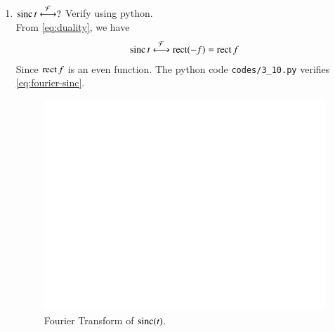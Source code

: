 \documentclass[journal,12pt,twocolumn]{IEEEtran}
\renewcommand\thesection{\arabic{section}}
\begin{document}
\begin{enumerate}[label=\thesection.\arabic*
,ref=\thesection.\theenumi]
\begin{figure}[!ht]
    \caption{Fourier Transform of $\rect(t)$.}
    \label{eq:fig-fourier-rect}
\end{figure}
\item $\mathop{\mathrm{sinc}}{t}\overset{\mathcal{F}}{ \longleftrightarrow} ?$  Verify using python.\\
\solution From \eqref{eq:duality}, we have 
\begin{align}
    \mathop{\mathrm{sinc}}{t}\overset{\mathcal{F}}{ \longleftrightarrow}\mathop{\mathrm{rect}}(-f)=\mathop{\mathrm{rect}}{f}
    \label{eq:fourier-sinc}
\end{align}
Since $\mathop{\mathrm{rect}}{f}$ is an even function.
The python code \texttt{codes/3\_10.py} verifies \eqref{eq:fourier-sinc}.
\begin{figure}[!ht]
    \includegraphics[width=\columnwidth]{figs/3_10.png}
    \caption{Fourier Transform of $\mathop{\mathrm{sinc}}(t)$.}
    \label{eq:fig-fourier-sinc}
\end{figure}
\end{enumerate}
\end{document}

